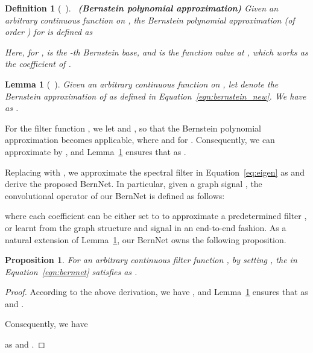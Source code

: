 \documentclass{article}
\newtheorem{proposition}{Proposition}[section]
\newtheorem{lemma}{Lemma}[section]
\newtheorem{definition}{Definition}[section]
\begin{document}
\begin{definition}[~\cite{farouki2012bernstein}]~\textbf{(Bernstein polynomial approximation)}
\label{def:bernstein}
Given an arbitrary continuous function  on , the Bernstein polynomial approximation (of order ) for  is defined as

Here, for ,  is the -th Bernstein base, and  is the function value at , which works as the coefficient of . 
\end{definition}
 
\begin{lemma}[~\cite{farouki2012bernstein}]
\label{lemma_bern}  Given an arbitrary continuous function  on , let  denote the Bernstein approximation of  as defined in Equation~\eqref{eqn:bernstein_new}. We have  as .
\end{lemma}

For the filter function , we let  and , so that the Bernstein polynomial approximation becomes applicable, where  and  for .
Consequently, we can approximate  by , and Lemma~\ref{lemma_bern} ensures that  as .


Replacing  with , we approximate the spectral filter  in Equation~\eqref{eq:eigen} as  and derive the proposed BernNet. 
In particular, given a graph signal , the convolutional operator of our BernNet is defined as follows: 

where each coefficient  can be either set to  to approximate a predetermined filter , or learnt from the graph structure and signal in an end-to-end fashion. 
As a natural extension of Lemma~\ref{lemma_bern}, our BernNet owns the following proposition.
\begin{proposition}
\label{thm:main}
For an arbitrary continuous filter function , by setting , the  in Equation~\eqref{eqn:bernnet} satisfies  as .
\end{proposition}

\begin{proof}
According to the above derivation, we have
, and Lemma~\ref{lemma_bern} ensures that  as  and .

Consequently, we have

as  and .

\end{proof}
\end{document}
